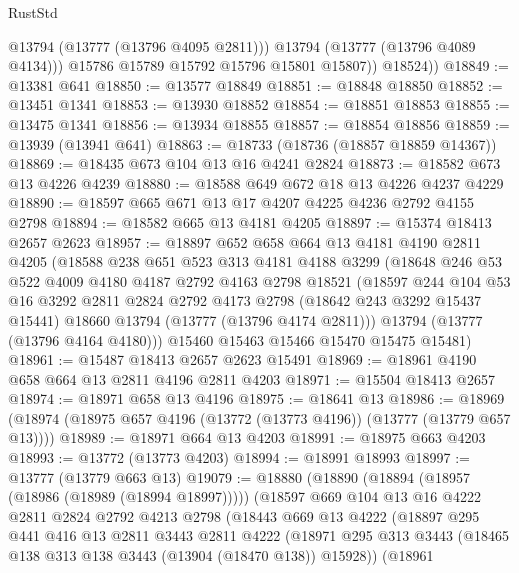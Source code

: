 \begin{lexlean}{RustStd}
\begin{coremodule}
                @13794
                (@13777 (@13796 @4095 @2811)))
              @13794
              (@13777 (@13796 @4089 @4134)))
            @15786
            @15789
            @15792
            @15796
            @15801
            @15807))
        @18524))
@18849 := @13381 @641
@18850 := @13577 @18849
@18851 := @18848 @18850
@18852 := @13451 @1341
@18853 := @13930 @18852
@18854 := @18851 @18853
@18855 := @13475 @1341
@18856 := @13934 @18855
@18857 := @18854 @18856
@18859 := @13939 (@13941 @641)
@18863 := @18733 (@18736 (@18857 @18859 @14367))
@18869 := @18435 @673 @104 @13 @16 @4241 @2824
@18873 := @18582 @673 @13 @4226 @4239
@18880 := @18588 @649 @672 @18 @13 @4226 @4237 @4229
@18890 := @18597 @665 @671 @13 @17 @4207 @4225 @4236 @2792 @4155 @2798
@18894 := @18582 @665 @13 @4181 @4205
@18897 := @15374 @18413 @2657 @2623
@18957 := @18897
    @652
    @658
    @664
    @13
    @4181
    @4190
    @2811
    @4205
    (@18588
      @238
      @651
      @523
      @313
      @4181
      @4188
      @3299
      (@18648
        @246
        @53
        @522
        @4009
        @4180
        @4187
        @2792
        @4163
        @2798
        @18521
        (@18597
          @244
          @104
          @53
          @16
          @3292
          @2811
          @2824
          @2792
          @4173
          @2798
          (@18642 @243 @3292 @15437 @15441)
          @18660
          @13794
          (@13777 (@13796 @4174 @2811)))
        @13794
        (@13777 (@13796 @4164 @4180)))
      @15460
      @15463
      @15466
      @15470
      @15475
      @15481)
@18961 := @15487 @18413 @2657 @2623 @15491
@18969 := @18961 @4190 @658 @664 @13 @2811 @4196 @2811 @4203
@18971 := @15504 @18413 @2657
@18974 := @18971 @658 @13 @4196
@18975 := @18641 @13
@18986 := @18969 (@18974 (@18975 @657 @4196 (@13772 (@13773 @4196)) (@13777 (@13779 @657 @13))))
@18989 := @18971 @664 @13 @4203
@18991 := @18975 @663 @4203
@18993 := @13772 (@13773 @4203)
@18994 := @18991 @18993
@18997 := @13777 (@13779 @663 @13)
@19079 := @18880
    (@18890
      (@18894 (@18957 (@18986 (@18989 (@18994 @18997)))))
      (@18597
        @669
        @104
        @13
        @16
        @4222
        @2811
        @2824
        @2792
        @4213
        @2798
        (@18443
          @669
          @13
          @4222
          (@18897
            @295
            @441
            @416
            @13
            @2811
            @3443
            @2811
            @4222
            (@18971 @295 @313 @3443 (@18465 @138 @313 @138 @3443 (@13904 (@18470 @138)) @15928))
            (@18961

\end{coremodule}
\end{lexlean}
